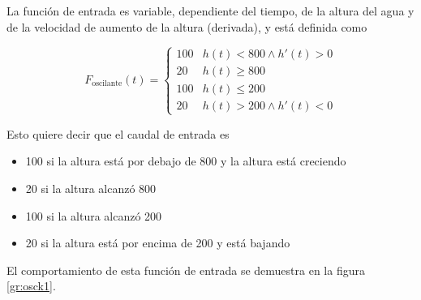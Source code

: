 \documentclass[12pt]{article}
\newcommand{\fosc}{F_\text{oscilante}}
\begin{document}
La función de entrada es variable, dependiente del tiempo, de la altura del agua y de la velocidad de aumento de la altura (derivada), y está definida como

\[ \fosc(t) = \begin{cases}
		100 & h(t) < 800 \land h'(t) > 0 \\
		20  & h(t) \geq 800              \\
		100 & h(t) \leq 200              \\
		20  & h(t) > 200 \land h'(t) < 0
	\end{cases} \]

Esto quiere decir que el caudal de entrada es

\begin{itemize}
	\item 100 si la altura está por debajo de 800 y la altura está creciendo
	\item 20 si la altura alcanzó 800
	\item 100 si la altura alcanzó 200
	\item 20 si la altura está por encima de 200 y está bajando
\end{itemize}

El comportamiento de esta función de entrada se demuestra en la figura \ref{gr:osck1}.
\end{document}
